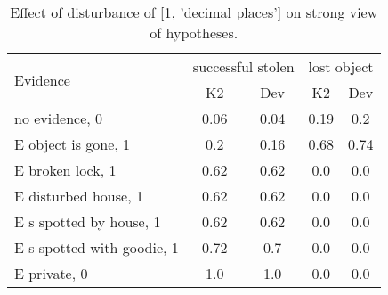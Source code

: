 \begin{table}\begin{tabular}{l|cc|cc}\toprule\multirow{2}{*}{Evidence} & \multicolumn{2}{c}{successful stolen}& \multicolumn{2}{c}{lost object}\\& {K2} & {Dev}& {K2} & {Dev}\\\midrule
no evidence, 0 & 0.06&0.04&0.19&0.2\\E object is gone, 1 & 0.2&0.16&\cellcolor{Bittersweet}0.68&\cellcolor{Bittersweet}0.74\\E broken lock, 1 & 0.62&0.62&0.0&0.0\\E disturbed house, 1 & 0.62&0.62&0.0&0.0\\E s spotted by house, 1 & 0.62&0.62&0.0&0.0\\E s spotted with goodie, 1 & 0.72&0.7&0.0&0.0\\E private, 0 & 1.0&1.0&0.0&0.0\\\bottomrule\end{tabular}\caption{Effect of disturbance of [1, 'decimal places'] on strong view of hypotheses.}\end{table}